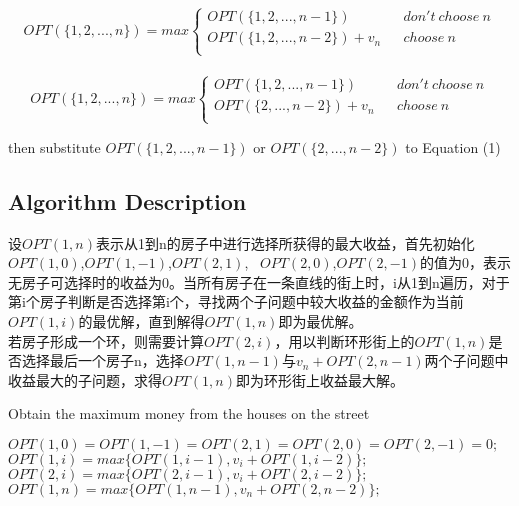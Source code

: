 \documentclass{article}
\begin{document}
\begin{CJK*}{UTF8}{gbsn}
\begin{equation} 
OPT(\{1,2,...,n\})=max\left\{
\begin{array}{lcr}
OPT(\{1,2,...,n-1\})       &      & don't\ choose\ n\\
OPT(\{1,2,...,n-2\})+ v_n     &      & choose\ n\\

\end{array} \right.
\end{equation} 
\\

\begin{equation} 
OPT(\{1,2,...,n\})=max\left\{
\begin{array}{lcr}
OPT(\{1,2,...,n-1\})       &      & don't\ choose\ n\\
OPT(\{2,...,n-2\})+ v_n     &      & choose\ n\\

\end{array} \right.
\end{equation}
 
\begin{center}
then substitute $OPT(\{1,2,...,n-1\})$ or $OPT(\{2,...,n-2\})$ to Equation (1)
\end{center}

\subsection{Algorithm Description}

设$OPT(1,n)$表示从1到n的房子中进行选择所获得的最大收益，首先初始化$OPT(1,0)$,$OPT(1,-1)$,$OPT(2,1)$,         \ $OPT(2,0)$,$OPT(2,-1)$的值为0，表示无房子可选择时的收益为0。当所有房子在一条直线的街上时，i从1到n遍历，对于第i个房子判断是否选择第i个，寻找两个子问题中较大收益的金额作为当前$OPT(1,i)$的最优解，直到解得$OPT(1,n)$即为最优解。
\\

若房子形成一个环，则需要计算$OPT(2,i)$，用以判断环形街上的$OPT(1,n)$是否选择最后一个房子n，选择$OPT(1,n-1)$与$v_n + OPT(2,n-1)$两个子问题中收益最大的子问题，求得$OPT(1,n)$即为环形街上收益最大解。

\begin{algorithm}[htbp]  
  \caption{Obtain the maximum money from the houses on the street}  
  \begin{algorithmic}[1] 
	\State $OPT(1,0) = OPT(1,-1) = OPT(2,1) = OPT(2,0) = OPT(2,-1) = 0;$
	\State $OPT(1,i) = max\{OPT(1,i-1), v_i + OPT(1,i-2)\};$
	\EndFor
	\State $OPT(2,i) = max\{OPT(2,i-1), v_i + OPT(2,i-2)\};$
	\EndFor
	\State $OPT(1,n) = max\{OPT(1,n-1), v_n + OPT(2,n-2)\};$
	\EndIf
    \EndFunction 
  \end{algorithmic}  
\end{algorithm} 


\end{CJK*}
\end{document}
